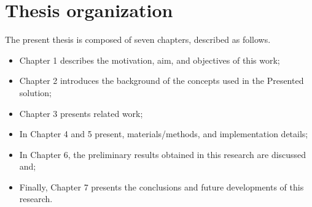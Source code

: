 \section{Thesis organization}

The present thesis is composed of seven chapters, described as follows.
\begin{itemize}
\item Chapter 1 describes the motivation, aim, and objectives of this work;
\item Chapter 2 introduces the background of the concepts used in the
Presented solution;
\item Chapter 3 presents related work;
\item In Chapter 4 and 5 present, materials/methods, and implementation details;
\item In Chapter 6, the preliminary results obtained in this research are discussed and;
\item Finally, Chapter 7 presents the conclusions and future developments of this research.
\end{itemize}